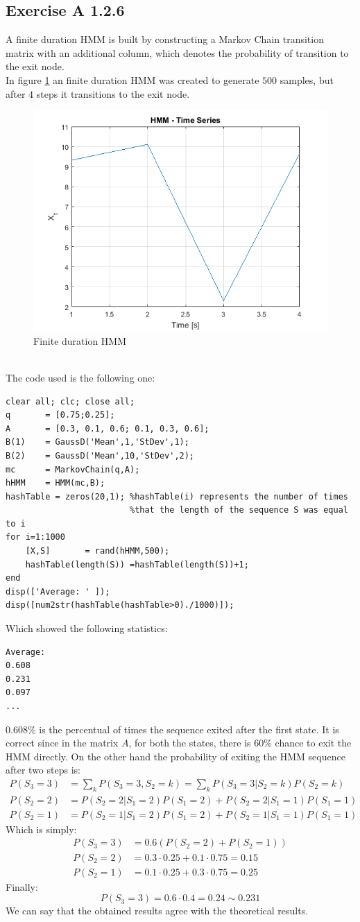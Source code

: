 \documentclass[10pt,a4paper,final]{article}
\begin{document}
\subsection{Exercise A 1.2.6}
A finite duration HMM is built by constructing a Markov Chain transition matrix with an additional column, which denotes the probability of transition to the exit node.
\\ In figure \ref{fig:A5} an finite duration HMM was created to generate $500$ samples, but after $4$ steps it transitions to the exit node.
\begin{figure}[h]
		\centering	\includegraphics[width=0.55\linewidth]{./images/A5.png}
		\caption{Finite duration HMM}
		\label{fig:A5}	
\end{figure}\\
The code used is the following one:
\begin{lstlisting}
clear all; clc; close all;
q       = [0.75;0.25];
A       = [0.3, 0.1, 0.6; 0.1, 0.3, 0.6];
B(1)    = GaussD('Mean',1,'StDev',1);
B(2)    = GaussD('Mean',10,'StDev',2);
mc      = MarkovChain(q,A);
hHMM    = HMM(mc,B);
hashTable = zeros(20,1); %hashTable(i) represents the number of times 
						 %that the length of the sequence S was equal to i
for i=1:1000
    [X,S]       = rand(hHMM,500);
    hashTable(length(S)) =hashTable(length(S))+1;
end
disp(['Average: ' ]);
disp([num2str(hashTable(hashTable>0)./1000)]);
\end{lstlisting}
Which showed the following statistics:
\begin{lstlisting}
Average: 
0.608
0.231
0.097
...
\end{lstlisting}
$0.608\%$ is the percentual of times the sequence exited after the first state. It is correct since in the matrix $A$, for both the states, there is $60\%$ chance to exit the HMM directly.
\newpage
On the other hand the probability of exiting the HMM sequence after two steps is:
\begin{align*}
P(S_3=3)&=\sum_k P(S_3=3,S_{2}=k)=\sum_k P(S_3=3|S_{2}=k)P(S_{2}=k) \\
P(S_2=2)&=P(S_2=2|S_1=2)P(S_1=2)+P(S_2=2|S_1=1)P(S_1=1)\\
P(S_2=1)&=P(S_2=1|S_1=2)P(S_1=2)+P(S_2=1|S_1=1)P(S_1=1)
\end{align*}
Which is simply:
\begin{align*}
P(S_3=3)&=0.6(P(S_2=2)+P(S_2=1))\\
P(S_2=2)&=0.3\cdot 0.25+0.1\cdot 0.75=0.15\\
P(S_2=1)&=0.1\cdot 0.25+0.3\cdot 0.75=0.25
\end{align*}
Finally:
$$P(S_3=3)=0.6\cdot 0.4=0.24 \sim 0.231$$
We can say that the obtained results agree with the theoretical results.
\newpage
\end{document}
